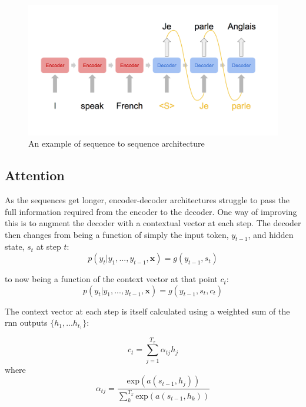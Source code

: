 
\begin{figure}[tb]
    \centering
    \includegraphics[width=\linewidth]{ModelPics/seq2seq.png}
    \caption{An example of sequence to sequence architecture}
    \label{fig:seqtoseq}
\end{figure}

\subsection{Attention} %

As the sequences get longer, encoder-decoder architectures struggle to pass the full information required from the encoder to the decoder. 
One way of improving this is to augment the decoder with a contextual vector at each step.
The decoder then changes from being a function of simply the input token, $y_{t-1}$, and hidden state, $s_{t}$ at step $t$:
\begin{equation}
p(y_t| y_1, ..., y_{t-1}, \mathbf{x} ) = g(y_{t-1}, s_t)
\end{equation}

to now being a function of the context vector at that point $c_t$:
\begin{equation}
p(y_t| y_1, ..., y_{t-1}, \mathbf{x} ) = g(y_{t-1}, s_t, c_t)
\end{equation}

The context vector at each step is itself calculated using a weighted sum of the rnn outputs $\{h_1,... h_{t_1}\}$:

\begin{equation}
c_t = \sum_{j=1}^{T_x}\alpha_{tj}h_j
\end{equation}
where
\begin{equation}
\alpha_{tj} = \dfrac{\text{exp}(a(s_{t-1}, h_j))}{\sum_k^{T_x}\text{exp}(a(s_{t-1}, h_k))}
\end{equation}


